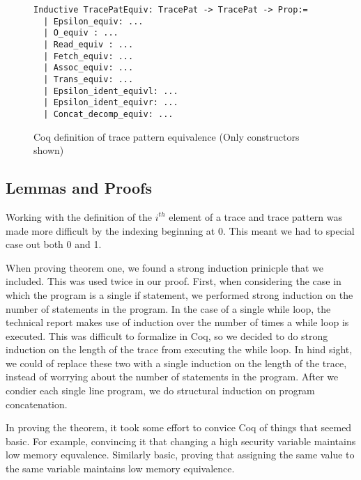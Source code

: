 \documentclass[10pt,  onecolumn]{article}
\begin{document}
\begin{figure}
\caption{ Coq definition of trace pattern equivalence (Only constructors shown) }
\label{fig:coq_TracePat_equiv}

\begin{lstlisting}
Inductive TracePatEquiv: TracePat -> TracePat -> Prop:=
  | Epsilon_equiv: ...
  | O_equiv : ...
  | Read_equiv : ...
  | Fetch_equiv: ...
  | Assoc_equiv: ...
  | Trans_equiv: ...
  | Epsilon_ident_equivl: ...
  | Epsilon_ident_equivr: ...
  | Concat_decomp_equiv: ...
\end{lstlisting}

\end{figure}









\subsection{ Lemmas and Proofs }

Working with the definition of  the $i^{th}$ element of a trace and trace pattern was made more difficult by the indexing beginning at 0.
This meant we had to special case out both 0 and 1. 







When proving theorem one, we found a strong induction prinicple that we included. \cite{strongind}
This was used twice in our proof. 
First, when considering the case in which the program is a single if statement, we performed strong induction on the number of statements in the program. 
In the case of a single while loop, the technical report makes use of induction over the number of times a while loop is executed. 
This was difficult to formalize in Coq, so we decided to do strong induction on the length of the trace from executing the while loop. 
In hind sight, we could of replace these two with a single induction on the length of the trace, instead of worrying about the number of statements in the program.
After we condier each single line program, we do structural induction on program concatenation.

In proving the theorem, it took some effort to convice Coq of things that seemed basic.  For example, convincing it that changing a high security variable maintains low memory equvalence.
Similarly basic, proving that assigning the same value to the same variable maintains low memory equivalence.
\end{document}
